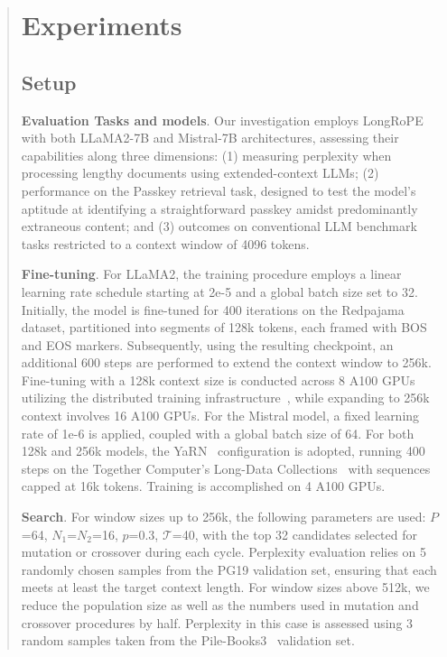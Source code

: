 \begin{abstract}
 \section{Experiments}

\label{sec:exp}
\subsection{Setup}
\textbf{Evaluation Tasks and models}. Our investigation employs LongRoPE with both LLaMA2-7B and Mistral-7B architectures, assessing their capabilities along three dimensions: (1) measuring perplexity when processing lengthy documents using extended-context LLMs; (2) performance on the Passkey retrieval task, designed to test the model's aptitude at identifying a straightforward passkey amidst predominantly extraneous content; and (3) outcomes on conventional LLM benchmark tasks restricted to a context window of 4096 tokens.

\textbf{Fine-tuning}. For LLaMA2, the training procedure employs a linear learning rate schedule starting at 2e-5 and a global batch size set to 32. Initially, the model is fine-tuned for 400 iterations on the Redpajama~\cite{redpajama} dataset, partitioned into segments of 128k tokens, each framed with BOS and EOS markers. Subsequently, using the resulting checkpoint, an additional 600 steps are performed to extend the context window to 256k. Fine-tuning with a 128k context size is conducted across 8 A100 GPUs utilizing the distributed training infrastructure~\cite{cube}, while expanding to 256k context involves 16 A100 GPUs. For the Mistral model, a fixed learning rate of 1e-6 is applied, coupled with a global batch size of 64. For both 128k and 256k models, the YaRN~\cite{yarn} configuration is adopted, running 400 steps on the Together Computer's Long-Data Collections~\cite{mistraldata} with sequences capped at 16k tokens. Training is accomplished on 4 A100 GPUs.

\textbf{Search}. For window sizes up to 256k, the following parameters are used: $P$=64, $N_1$=$N_2$=16, $p$=0.3, $\mathcal{T}$=40, with the top 32 candidates selected for mutation or crossover during each cycle. Perplexity evaluation relies on 5 randomly chosen samples from the PG19 validation set, ensuring that each meets at least the target context length. For window sizes above 512k, we reduce the population size as well as the numbers used in mutation and crossover procedures by half. Perplexity in this case is assessed using 3 random samples taken from the Pile-Books3~\cite{pile} validation set.


\end{abstract}
